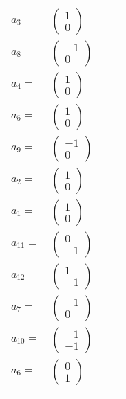 \documentclass[1p]{elsarticle_modified}
\theoremstyle{definition}
\begin{document}
\begin{tabular}{m{7pt} m{180pt} m{7pt} m{180pt} }
\flushright $a_{3}=$&$\begin{pmatrix}1\\0\end{pmatrix}$ \\
\flushright $a_{8}=$&$\begin{pmatrix}-1\\0\end{pmatrix}$ \\
\flushright $a_{4}=$&$\begin{pmatrix}1\\0\end{pmatrix}$ \\
\flushright $a_{5}=$&$\begin{pmatrix}1\\0\end{pmatrix}$ \\
\flushright $a_{9}=$&$\begin{pmatrix}-1\\0\end{pmatrix}$ \\
\flushright $a_{2}=$&$\begin{pmatrix}1\\0\end{pmatrix}$ \\
\flushright $a_{1}=$&$\begin{pmatrix}1\\0\end{pmatrix}$ \\
\flushright $a_{11}=$&$\begin{pmatrix}0\\-1\end{pmatrix}$ \\
\flushright $a_{12}=$&$\begin{pmatrix}1\\-1\end{pmatrix}$ \\
\flushright $a_{7}=$&$\begin{pmatrix}-1\\0\end{pmatrix}$ \\
\flushright $a_{10}=$&$\begin{pmatrix}-1\\-1\end{pmatrix}$ \\
\flushright $a_{6}=$&$\begin{pmatrix}0\\1\end{pmatrix}$\\&\end{tabular}
\end{document}
